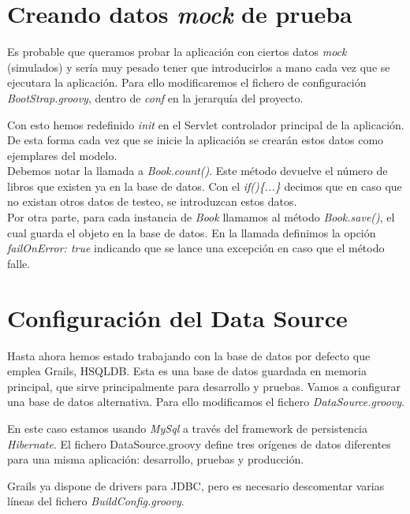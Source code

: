 \documentclass[a4paper,12pt,spanish]{article}
\begin{document}
\section{Creando datos \textit{mock} de prueba}

Es probable que queramos probar la aplicación con ciertos datos \textit{mock} (simulados) y sería muy pesado tener que introducirlos a mano cada vez que se ejecutara la aplicación. Para ello modificaremos el fichero de configuración {\it BootStrap.groovy}, dentro de {\it conf} en la jerarquía del proyecto.



Con esto hemos redefinido {\it init} en el Servlet controlador principal de la aplicación. De esta forma cada vez que se inicie la aplicación se crearán estos datos como ejemplares del modelo.\\ 

Debemos notar la llamada a {\it Book.count()}. Este método devuelve el número de libros que existen ya en la base de datos. Con el {\it if()\{...\}} decimos que en caso que no existan otros datos de testeo, se introduzcan estos datos.\\

Por otra parte, para cada instancia de {\it Book} llamamos al método {\it Book.save()}, el cual guarda el objeto en la base de datos. En la llamada definimos la opción {\it failOnError: true} indicando que se lance una excepción en caso que el método falle.

\section{Configuración del Data Source}

Hasta ahora hemos estado trabajando con la base de datos por defecto que emplea Grails, HSQLDB. Esta es una base de datos guardada en memoria principal, que sirve principalmente para desarrollo y pruebas. Vamos a configurar una base de datos alternativa. Para ello modificamos el fichero {\it DataSource.groovy}.



En este caso estamos usando {\it MySql} a través del framework de persistencia {\it Hibernate}. El fichero DataSource.groovy define tres orígenes de datos diferentes para una misma aplicación: desarrollo, pruebas y producción.

Grails ya dispone de drivers para JDBC, pero es necesario descomentar varias líneas del fichero {\it BuildConfig.groovy}.
\end{document}
